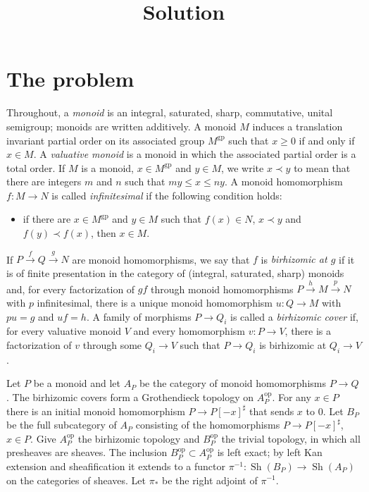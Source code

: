 \documentclass[11pt]{article}
\title{Solution}
\author{}
\date{}
\theoremstyle{definition}
\theoremstyle{remark}
\newcommand{\gp}{\mathrm{gp}}
\newcommand{\Sh}{\operatorname{Sh}}
\begin{document}
\maketitle

\section{The problem}

Throughout, a \emph{monoid} is an integral, saturated, sharp, commutative, unital semigroup; monoids are written additively. A monoid $M$ induces a translation invariant partial order on its associated group $M^{\gp}$ such that $x\ge 0$ if and only if $x\in M$. A \emph{valuative monoid} is a monoid in which the associated partial order is a total order. If $M$ is a monoid, $x\in M^{\gp}$ and $y\in M$, we write $x\prec y$ to mean that there are integers $m$ and $n$ such that $my\le x\le ny$. A monoid homomorphism $f\colon M\to N$ is called \emph{infinitesimal} if the following condition holds:
\begin{itemize}
\item if there are $x\in M^{\gp}$ and $y\in M$ such that $f(x)\in N$, $x\prec y$ and $f(y)\prec f(x)$, then $x\in M$.
\end{itemize}
If $P\xrightarrow{f}Q\xrightarrow{g}N$ are monoid homomorphisms, we say that $f$ is \emph{birhizomic at $g$} if it is of finite presentation in the category of (integral, saturated, sharp) monoids and, for every factorization of $gf$ through monoid homomorphisms $P\xrightarrow{h}M\xrightarrow{p}N$ with $p$ infinitesimal, there is a unique monoid homomorphism $u\colon Q\to M$ with $pu=g$ and $uf=h$. A family of morphisms $P\to Q_i$ is called a \emph{birhizomic cover} if, for every valuative monoid $V$ and every homomorphism $v\colon P\to V$, there is a factorization of $v$ through some $Q_i\to V$ such that $P\to Q_i$ is birhizomic at $Q_i\to V$.

Let $P$ be a monoid and let $A_P$ be the category of monoid homomorphisms $P\to Q$. The birhizomic covers form a Grothendieck topology on $A_P^{\mathrm{op}}$. For any $x\in P$ there is an initial monoid homomorphism $P\to P[-x]^\sharp$ that sends $x$ to $0$. Let $B_P$ be the full subcategory of $A_P$ consisting of the homomorphisms $P\to P[-x]^\sharp$, $x\in P$. Give $A_P^{\mathrm{op}}$ the birhizomic topology and $B_P^{\mathrm{op}}$ the trivial topology, in which all presheaves are sheaves. The inclusion $B_P^{\mathrm{op}}\subset A_P^{\mathrm{op}}$ is left exact; by left Kan extension and sheafification it extends to a functor $\pi^{-1}\colon \Sh(B_P)\to\Sh(A_P)$ on the categories of sheaves. Let $\pi_*$ be the right adjoint of $\pi^{-1}$.
\end{document}
